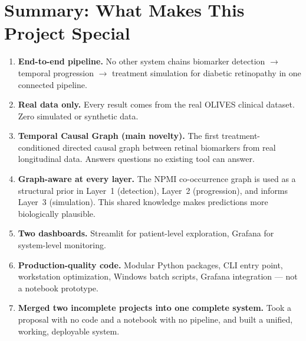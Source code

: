 \documentclass[12pt,a4paper]{article}
\begin{document}
\section{Summary: What Makes This Project Special}

\begin{enumerate}[leftmargin=*]
  \item \textbf{End-to-end pipeline.} No other system chains biomarker detection $\to$ temporal progression $\to$ treatment simulation for diabetic retinopathy in one connected pipeline.

  \item \textbf{Real data only.} Every result comes from the real OLIVES clinical dataset. Zero simulated or synthetic data.

  \item \textbf{Temporal Causal Graph (main novelty).} The first treatment-conditioned directed causal graph between retinal biomarkers from real longitudinal data. Answers questions no existing tool can answer.

  \item \textbf{Graph-aware at every layer.} The NPMI co-occurrence graph is used as a structural prior in Layer~1 (detection), Layer~2 (progression), and informs Layer~3 (simulation). This shared knowledge makes predictions more biologically plausible.

  \item \textbf{Two dashboards.} Streamlit for patient-level exploration, Grafana for system-level monitoring.

  \item \textbf{Production-quality code.} Modular Python packages, CLI entry point, workstation optimization, Windows batch scripts, Grafana integration --- not a notebook prototype.

  \item \textbf{Merged two incomplete projects into one complete system.} Took a proposal with no code and a notebook with no pipeline, and built a unified, working, deployable system.
\end{enumerate}
\end{document}
